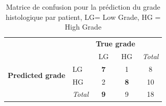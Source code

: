 \documentclass[]{memoir}
\begin{document}
\begin{table}[!ht]
	\centering
	\caption{Matrice de confusion pour la prédiction du grade histologique par patient, LG= Low Grade, HG = High Grade}\label{tab:confusion_matrix}
	\begin{tabular}{l|l|c|c|c}
		\multicolumn{2}{c}{}&\multicolumn{2}{c}{\textbf{True grade}}&\\
		\cline{3-4}
		\multicolumn{2}{c|}{}&LG&HG&\multicolumn{1}{c}{\textit{Total}}\\
		\cline{2-4}
		\multirow{2}{*}{\textbf{Predicted grade}}& LG & \textbf{7} & 1 & 8\\
		\cline{2-4}
		& HG & 2 & \textbf{8} & 10 \\
		\cline{2-4}
		\multicolumn{1}{c}{} & \multicolumn{1}{c}{\textit{Total}} & \multicolumn{1}{c}{\textbf{9}} & \multicolumn{1}{c}{9} & \multicolumn{1}{c}{18}\\
	\end{tabular}
\end{table}
\end{document}
